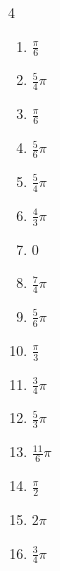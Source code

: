 \begin{multicols}{4}
\begin{enumerate}
  \item $\displaystyle \frac{\pi}{6}$

  \item $\displaystyle \frac{5}{4}\pi$

  \item $\displaystyle \frac{\pi}{6}$

  \item $\displaystyle \frac{5}{6}\pi$

  \item $\displaystyle \frac{5}{4}\pi$

  \item $\displaystyle \frac{4}{3}\pi$

  \item $\displaystyle 0$

  \item $\displaystyle \frac{7}{4}\pi$

  \item $\displaystyle \frac{5}{6}\pi$

  \item $\displaystyle \frac{\pi}{3}$

  \item $\displaystyle \frac{3}{4}\pi$

  \item $\displaystyle \frac{5}{3}\pi$

  \item $\displaystyle \frac{11}{6}\pi$

  \item $\displaystyle \frac{\pi}{2}$

  \item $\displaystyle 2\pi$

  \item $\displaystyle \frac{3}{4}\pi$


\end{enumerate}
\end{multicols}
